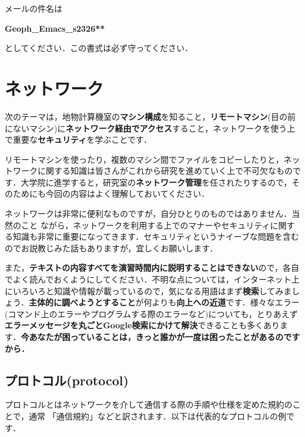 \documentclass{jarticle}
\begin{document}
メールの件名は 
\begin{center}
{\bf{Geoph\_Emacs\_s2326**}}\\
\end{center}
としてください．この書式は必ず守ってください．

\section{ネットワーク}
次のテーマは，地物計算機室の{\bf マシン構成}を知ること，{\bf リモートマシン}(目の前にないマシン)に{\bf ネットワーク経由でアクセス}すること，ネットワークを使う上で重要な{\bf セキュリティ}を学ぶことです．

リモートマシンを使ったり，複数のマシン間でファイルをコピーしたりと，ネットワークに関する知識は皆さんがこれから研究を進めていく上で不可欠なものです．大学院に進学すると，研究室の{\bf ネットワーク管理}を任されたりするので，そのためにも今回の内容はよく理解しておいてください．

\vspace{1em}

ネットワークは非常に便利なものですが，自分ひとりのものではありません．当然のこと
ながら，ネットワークを利用する上でのマナーやセキュリティに関する知識も非常に重要になってきます．セキュリティというナイーブな問題を含むのでお説教じみた話もありますが，宜しくお願いします．

また，{\bf テキストの内容すべてを演習時間内に説明することはできない}ので，各自でよく読んでおくようにしてください．不明な点については，インターネット上にいろいろと知識や情報が載っているので，気になる用語はまず{\bf 検索}してみましょう．{\bf 主体的に調べようとすること}が何よりも{\bf 向上への近道}です．様々なエラー(コマンド上のエラーやプログラムする際のエラーなど)についても，とりあえず{\bf エラーメッセージを丸ごとGoogle検索にかけて解決}できることも多くあります．{\bf 今あなたが困っていることは，きっと誰かが一度は困ったことがあるのですから．}

\subsection{プロトコル(protocol)}
プロトコルとはネットワークを介して通信する際の手順や仕様を定めた規約のことで，通常
「通信規約」などと訳されます．以下は代表的なプロトコルの例です．
\end{document}
